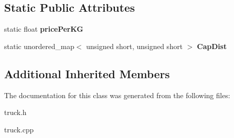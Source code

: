 \subsection*{Static Public Attributes}
\begin{DoxyCompactItemize}
\item 
\mbox{\label{class_animal_aa421a3d5192279ca552a62ab3e0517c2}} 
static float {\bfseries price\+Per\+KG}
\item 
\mbox{\label{class_animal_a49d5aaceba02edb1e887131cc596f8ac}} 
static unordered\+\_\+map$<$ unsigned short, unsigned short $>$ {\bfseries Cap\+Dist}
\end{DoxyCompactItemize}
\subsection*{Additional Inherited Members}


The documentation for this class was generated from the following files\+:\begin{DoxyCompactItemize}
\item 
truck.\+h\item 
truck.\+cpp\end{DoxyCompactItemize}
